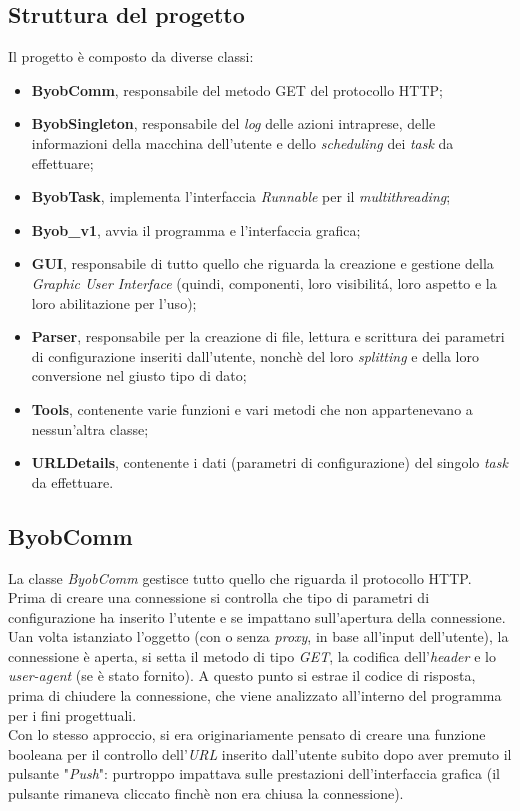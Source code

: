 \subsection{Struttura del progetto}
Il progetto \`e composto da diverse classi:
\begin{itemize}
\item \textbf{ByobComm}, responsabile del metodo GET del protocollo HTTP;
\item \textbf{ByobSingleton}, responsabile del \textit{log} delle azioni intraprese, delle informazioni della macchina dell'utente e dello \textit{scheduling} dei \textit{task} da effettuare;
\item \textbf{ByobTask}, implementa l'interfaccia \textit{Runnable} per il \textit{multithreading};
\item \textbf{Byob\_v1}, avvia il programma e l'interfaccia grafica;
\item \textbf{GUI}, responsabile di tutto quello che riguarda la creazione e gestione della \textit{Graphic User Interface} (quindi, componenti, loro visibilit\'a, loro aspetto e la loro abilitazione per l'uso);
\item \textbf{Parser}, responsabile per la creazione di file, lettura e scrittura dei parametri di configurazione inseriti dall'utente, nonch\`e del loro \textit{splitting} e della loro conversione nel giusto tipo di dato;
\item \textbf{Tools}, contenente varie funzioni e vari metodi che non appartenevano a nessun'altra classe;
\item \textbf{URLDetails}, contenente i dati (parametri di configurazione) del singolo \textit{task} da effettuare.
\end{itemize} 

\vspace*{0.5cm}
\subsection{ByobComm}
La classe \textit{ByobComm} gestisce tutto quello che riguarda il protocollo HTTP.\\
Prima di creare una connessione si controlla che tipo di parametri di configurazione ha inserito l'utente e se impattano sull'apertura della connessione. Uan volta istanziato l'oggetto (con o senza \textit{proxy}, in base all'input dell'utente), la connessione \`e aperta, si setta il metodo di tipo \textit{GET}, la codifica dell'\textit{header} e lo \textit{user-agent} (se \`e stato fornito). A questo punto si estrae il codice di risposta, prima di chiudere la connessione, che viene analizzato all'interno del programma per i fini progettuali. \\
Con lo stesso approccio, si era originariamente pensato di creare una funzione booleana per il controllo dell'\textit{URL} inserito dall'utente subito dopo aver premuto il pulsante "\textit{Push}": purtroppo impattava sulle prestazioni dell'interfaccia grafica (il pulsante rimaneva cliccato finch\`e non era chiusa la connessione).

